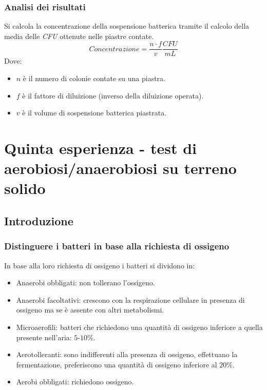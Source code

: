 		\subsubsection{Analisi dei risultati}
		Si calcola la concentrazione della sospensione batterica tramite il calcolo della media delle \emph{CFU} ottenute nelle piastre contate.
		\[Concentrazione=\dfrac{n\cdot f}{v}\dfrac{CFU}{\si{mL}}\]
		Dove:
		\begin{multicols}{3}
			\begin{itemize}
				\item $n$ \`e il numero di colonie contate su una piastra.
				\item $f$ \`e il fattore di diluizione (inverso della diluizione operata).
				\item $v$ \`e il volume di sospensione batterica piastrata.
			\end{itemize}
		\end{multicols}

\section{Quinta esperienza - test di aerobiosi/anaerobiosi su terreno solido}

	\subsection{Introduzione}

		\subsubsection{Distinguere i batteri in base alla richiesta di ossigeno}
		In base alla loro richiesta di ossigeno i batteri si dividono in:
		\begin{multicols}{2}
			\begin{itemize}
				\item Anaerobi obbligati: non tollerano l'ossigeno.
				\item Anaerobi facoltativi: crescono con la respirazione cellulare in presenza di ossigeno ma se \`e assente con altri metabolismi.
				\item Microaerofili: batteri che richiedono una quantit\`a di ossigeno inferiore a quella presente nell'aria: $5$-$10\%$.
				\item Aerotolleranti: sono indifferenti alla presenza di ossigeno, effettuano la fermentazione, preferiscono una quantit\`a di ossigeno inferiore al $20\%$.
				\item Aerobi obbligati: richiedono ossigeno.
			\end{itemize}
		\end{multicols}

